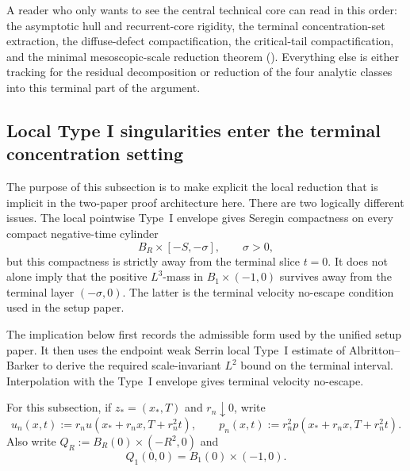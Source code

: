 \documentclass[11pt]{amsart}
\numberwithin{equation}{section}
\theoremstyle{plain}
\theoremstyle{definition}
\theoremstyle{remark}
\begin{document}
A reader who only wants to see the central technical core can read in this
order: the asymptotic hull and recurrent-core rigidity, the terminal
concentration-set extraction, the diffuse-defect compactification, the
critical-tail compactification, and the minimal mesoscopic-scale reduction
theorem ().  Everything else is
either tracking for the residual decomposition or reduction of the four
analytic classes into this terminal part of the argument.

\subsection{Local Type I singularities enter the terminal concentration setting}
\label{sec:local-typeI-implication}

The purpose of this subsection is to make explicit the local reduction that is
implicit in the two-paper proof architecture here.  There are two logically
different issues.  The local pointwise Type~I envelope gives Seregin compactness
on every compact negative-time cylinder
\[
   B_R\times[-S,-\sigma],\qquad \sigma>0,
\]
but this compactness is strictly away from the terminal slice \(t=0\).  It does
not alone imply that the positive \(L^3\)-mass in
\(B_1\times(-1,0)\) survives away from the terminal layer
\((- \sigma,0)\).  The latter is the terminal velocity no-escape
condition used in the setup paper.

The implication below first records the admissible form used by the unified setup
paper.  It then uses the endpoint weak Serrin local Type~I estimate of
Albritton--Barker to derive the required scale-invariant \(L^2\) bound on the
terminal interval.  Interpolation with the Type~I envelope gives terminal
velocity no-escape.

For this subsection, if \(z_*=(x_*,T)\) and \(r_n\downarrow0\), write
\[
   u_n(x,t):=r_nu(x_*+r_nx,T+r_n^2t),
   \qquad
   p_n(x,t):=r_n^2p(x_*+r_nx,T+r_n^2t).
\]
Also write \(Q_R:=B_R(0)\times(-R^2,0)\) and
\[
   Q_1(0,0)=B_1(0)\times(-1,0).
\]
\end{document}
